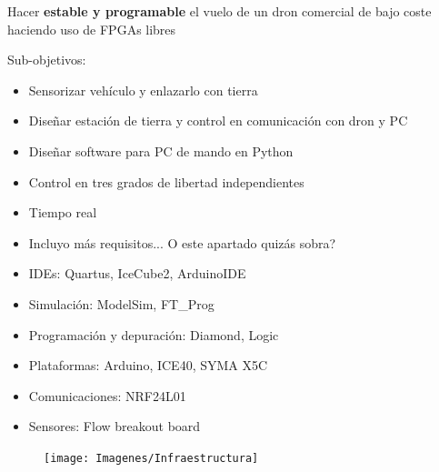 \documentclass[a4,landscpae]{seminar}
\begin{document}
\begin{hslide}
Hacer \textbf{estable y programable} el vuelo de un dron comercial de
bajo coste haciendo uso de FPGAs libres

Sub-objetivos:
	\begin{itemize}
		\item Sensorizar veh\'iculo y enlazarlo con tierra
		\item Dise\~nar estaci\'on de tierra y control en comunicaci\'on con dron y PC
		\item Dise\~nar software para PC de mando en Python
	\end{itemize}
\end{hslide}
\begin{hslide}
	\begin{itemize}
		\item Control en tres grados de libertad independientes
		\item Tiempo real
		\item Incluyo m\'as requisitos... O este apartado quiz\'as sobra?
	\end{itemize}
\end{hslide}



\begin{hslide}
\begin{minipage}{6.5cm}
	\begin{itemize}
		\item IDEs: Quartus, IceCube2, ArduinoIDE
		\item Simulaci\'on: ModelSim, FT\_Prog
		\item Programaci\'on y depuraci\'on: Diamond, Logic
	\end{itemize}
	\begin{itemize}
		\item Plataformas: Arduino, ICE40, SYMA X5C
		\item Comunicaciones: NRF24L01
		\item Sensores: Flow breakout board

	\end{itemize}
\end{minipage} \hfill
\begin{minipage}{4cm}
	\begin{figure}
		\texttt{[image: Imagenes/Infraestructura]}
	\end{figure}
\end{minipage} \hfill
\end{hslide}
\end{document}
